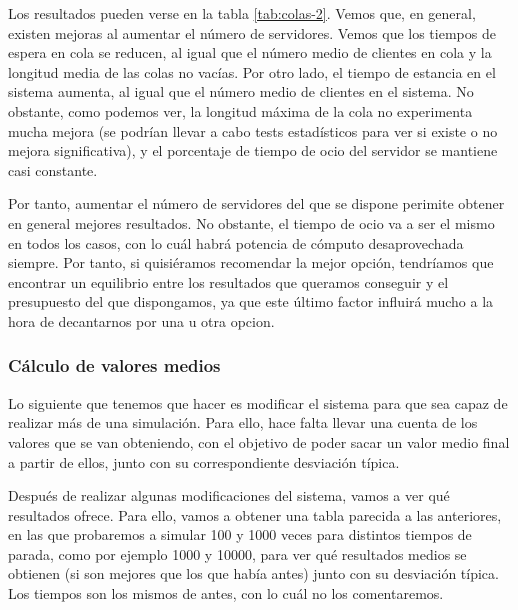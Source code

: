 \documentclass[11pt,a4paper]{article}
\begin{document}
Los resultados pueden verse en la tabla \ref{tab:colas-2}. Vemos que, en general,
existen mejoras al aumentar el número de servidores. Vemos que los tiempos de espera
en cola se reducen, al igual que el número medio de clientes en cola y la longitud media
de las colas no vacías. Por otro lado, el tiempo de estancia en el sistema aumenta, al
igual que el número medio de clientes en el sistema. No obstante, como podemos ver,
la longitud máxima de la cola no experimenta mucha mejora (se podrían llevar a cabo
tests estadísticos para ver si existe o no mejora significativa), y el porcentaje
de tiempo de ocio del servidor se mantiene casi constante.

Por tanto, aumentar el número de servidores del que se dispone perimite obtener en
general mejores resultados. No obstante, el tiempo de ocio va a ser el mismo en todos
los casos, con lo cuál habrá potencia de cómputo desaprovechada siempre. Por tanto,
si quisiéramos recomendar la mejor opción, tendríamos que encontrar un equilibrio entre
los resultados que queramos conseguir y el presupuesto del que dispongamos, ya que este
último factor influirá mucho a la hora de decantarnos por una u otra opcion.

\subsubsection{Cálculo de valores medios}

Lo siguiente que tenemos que hacer es modificar el sistema para que sea capaz
de realizar más de una simulación. Para ello, hace falta llevar una cuenta de
los valores que se van obteniendo, con el objetivo de poder sacar un valor medio
final a partir de ellos, junto con su correspondiente desviación típica.

Después de realizar algunas modificaciones del sistema, vamos a ver qué resultados
ofrece. Para ello, vamos a obtener una tabla parecida a las anteriores, en las que
probaremos a simular 100 y 1000 veces para distintos tiempos de parada, como por
ejemplo 1000 y 10000, para ver qué resultados medios se obtienen (si son mejores
que los que había antes) junto con su desviación típica. Los tiempos son los mismos
de antes, con lo cuál no los comentaremos.
\end{document}
